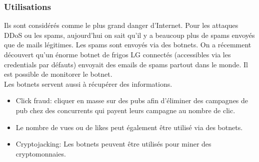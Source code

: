\documentclass[12pt, oneside]{article}
\begin{document}
\subsubsection{Utilisations}
Ils sont considérés comme le plus grand danger d'Internet. Pour les attaques DDoS ou les spams, aujourd'hui on sait qu'il y a beaucoup plus de spams envoyés que de mails légitimes. Les spams sont envoyés via des botnets. On a récemment découvert qu'un énorme botnet de frigos LG connectés (accessibles via les credentials par défauts) envoyait des emails de spams partout dans le monde. Il est possible de monitorer le botnet.\\
Les botnets servent aussi à récupérer des informations.
\begin{itemize}
\item Click fraud: cliquer en masse sur des pubs afin d'éliminer des campagnes de pub chez des concurrents qui payent leurs campagne au nombre de clic.
\item Le nombre de vues ou de likes peut également être utilisé via des botnets.
\item Cryptojacking: Les botnets peuvent être utilisés pour miner des cryptomonnaies.
\end{itemize}
\end{document}
